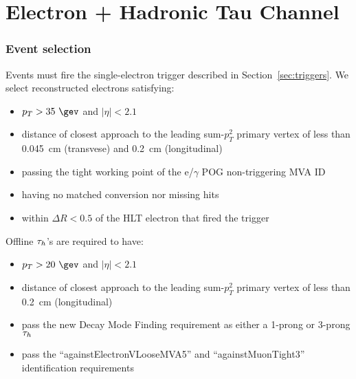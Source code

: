 \chapter{Electron + Hadronic Tau Channel}\label{sec:eTauhad}


\subsection{Event selection}\label{sec:et_selection}


Events must fire the single-electron trigger described in
Section~\ref{sec:triggers}.  We select reconstructed electrons
satisfying:
\begin{itemize}
  \item $p_T>35~\gev$ and $\vert\eta\vert<2.1$
  \item distance of closest approach to the leading 
sum-$p_T^2$ primary vertex of less than 0.045~cm 
(transvese) and 0.2~cm (longitudinal)
  \item passing the tight working point of the e/$\gamma$ 
POG non-triggering MVA ID
  \item having no matched conversion nor missing hits
  \item within $\Delta R<0.5$ of the HLT electron that fired the trigger

\end{itemize}


Offline $\tau_h$'s are required to have:
\begin{itemize}
  \item $p_{T}> 20~\gev$ and $\vert \eta \vert < 2.1$
  \item distance of closest approach to the leading
sum-$p_T^2$ primary vertex of less than 0.2~cm (longitudinal)
  \item pass the new Decay Mode Finding requirement as 
either a 1-prong or 3-prong $\tau_h$
  \item pass the ``againstElectronVLooseMVA5'' and
``againstMuonTight3'' identification requirements
\end{itemize}

